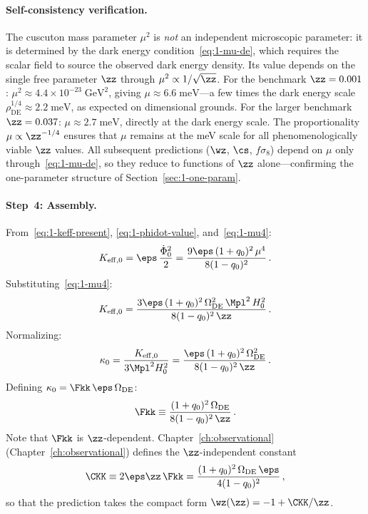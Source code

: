 \paragraph{Self-consistency verification.} The cuscuton mass parameter $\mu^2$ is \emph{not} an independent microscopic parameter: it is determined by the dark energy condition~\eqref{eq:1-mu-de}, which requires the scalar field to source the observed dark energy density. Its value depends on the single free parameter $\zz$ through $\mu^2 \propto 1/\sqrt{\zz}$. For the benchmark $\zz = 0.001$: $\mu^2 \approx 4.4 \times 10^{-23}\;\mathrm{GeV}^2$, giving $\mu \approx 6.6\;\mathrm{meV}$---a few times the dark energy scale $\rho_{\mathrm{DE}}^{1/4} \approx 2.2\;\mathrm{meV}$, as expected on dimensional grounds. For the larger benchmark $\zz = 0.037$: $\mu \approx 2.7\;\mathrm{meV}$, directly at the dark energy scale. The proportionality $\mu \propto \zz^{-1/4}$ ensures that $\mu$ remains at the meV scale for all phenomenologically viable $\zz$ values. All subsequent predictions ($\wz$, $\cs$, $f\sigma_8$) depend on $\mu$ only through~\eqref{eq:1-mu-de}, so they reduce to functions of $\zz$ alone---confirming the one-parameter structure of Section~\ref{sec:1-one-param}.

\paragraph{Step~4: Assembly.} From~\eqref{eq:1-keff-present}, \eqref{eq:1-phidot-value}, and~\eqref{eq:1-mu4}:
\begin{equation}
\label{eq:1-keff-assembled}
K_{\mathrm{eff},0} = \eps\,\frac{\dot\Phi_0^2}{2} = \frac{9\eps\,(1+q_0)^2\,\mu^4}{8(1 - q_0)^2}\,.
\end{equation}
Substituting~\eqref{eq:1-mu4}:
\begin{equation}
\label{eq:1-keff-substituted}
K_{\mathrm{eff},0} = \frac{3\eps\,(1+q_0)^2\,\Omega_{\mathrm{DE}}^2\, \Mpl^2\, H_0^2}{8(1 - q_0)^2\,\zz}\,.
\end{equation}
Normalizing:
\begin{equation}
\label{eq:1-kappa0}
\kappa_0 = \frac{K_{\mathrm{eff},0}}{3\Mpl^2 H_0^2} = \frac{\eps\,(1+q_0)^2\,\Omega_{\mathrm{DE}}^2}{8(1 - q_0)^2\,\zz}\,.
\end{equation}
Defining $\kappa_0 = \Fkk\,\eps\,\Omega_{\mathrm{DE}}$:
\begin{equation}
\label{eq:1-fkk}
\Fkk \equiv \frac{(1+q_0)^2\,\Omega_{\mathrm{DE}}}{8(1 - q_0)^2\,\zz}\,.
\end{equation}
Note that $\Fkk$ is $\zz$-dependent. Chapter~\ref{ch:observational} (Chapter~\ref{ch:observational}) defines the $\zz$-independent constant
\begin{equation}
\label{eq:1-ckk-bridge}
\CKK \equiv 2\eps\zz\,\Fkk = \frac{(1+q_0)^2\,\Omega_{\mathrm{DE}}\,\eps}{4(1-q_0)^2}\,,
\end{equation}
so that the prediction takes the compact form $\wz(\zz) = -1 + \CKK/\zz$.

